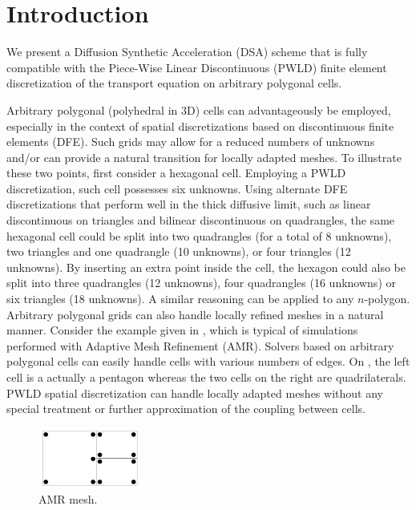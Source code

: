 \section{Introduction}

We present a Diffusion Synthetic Acceleration (DSA) scheme
that is fully compatible with the Piece-Wise Linear Discontinuous (PWLD) finite
element discretization of the transport equation on arbitrary
polygonal cells. 

Arbitrary polygonal (polyhedral in 3D) cells can advantageously be employed, especially
in the context of spatial discretizations based on discontinuous finite elements (DFE).
Such grids may allow for a reduced numbers of unknowns and/or can provide a natural
transition for locally adapted meshes. To illustrate these two points, first consider
a hexagonal cell. Employing a PWLD discretization, such cell possesses six unknowns. Using
alternate DFE discretizations that perform well in the thick diffusive limit, such as 
linear discontinuous on triangles and bilinear discontinuous on quadrangles, the same 
hexagonal cell could be split into two quadrangles (for a total of 8 unknowns), two 
triangles and one quadrangle (10 unknowns), or four triangles (12 unknowns). By inserting an 
extra point inside the cell, the hexagon could also be split into three quadrangles 
(12 unknowns), four quadrangles (16 unknowns) or six triangles (18 unknowns). A 
similar reasoning can be applied to any $n$-polygon. Arbitrary polygonal grids can 
also handle locally refined meshes in a natural manner. Consider the example given
in , which is typical of simulations performed with Adaptive Mesh 
Refinement (AMR). Solvers based on arbitrary polygonal cells can easily handle cells 
with various numbers of edges. On , the left cell is a actually a
pentagon whereas the two cells on the right are quadrilaterals. PWLD spatial
discretization can handle locally adapted meshes without any special treatment 
or further approximation of the coupling between cells.
\begin{figure}[H]
   \centering
   \includegraphics[width=0.3\textwidth]{amr}
   \caption{AMR mesh.}
   \label{fig_amr}
\end{figure}


